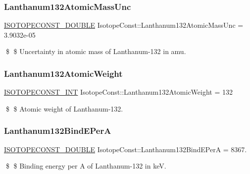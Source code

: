 \subsubsection{\texorpdfstring{Lanthanum132\+Atomic\+Mass\+Unc}{Lanthanum132AtomicMassUnc}}
{\footnotesize\ttfamily \mbox{\hyperlink{group___isotope_const-_macros_ga8f45a7272ce02c0b4c65c44636ed719a}{I\+S\+O\+T\+O\+P\+E\+C\+O\+N\+S\+T\+\_\+\+D\+O\+U\+B\+LE}} Isotope\+Const\+::\+Lanthanum132\+Atomic\+Mass\+Unc = 3.\+9032e-\/05}

\$ \$ Uncertainty in atomic mass of Lanthanum-\/132 in amu. \mbox{\label{group___isotope_const-_lanthanum-_la132_gacda93d8eca7ae011665dc08cb6784c66}} 
\subsubsection{\texorpdfstring{Lanthanum132\+Atomic\+Weight}{Lanthanum132AtomicWeight}}
{\footnotesize\ttfamily \mbox{\hyperlink{group___isotope_const-_macros_ga5f18360b3e99483a35c32d789e62621c}{I\+S\+O\+T\+O\+P\+E\+C\+O\+N\+S\+T\+\_\+\+I\+NT}} Isotope\+Const\+::\+Lanthanum132\+Atomic\+Weight = 132}

\$ \$ Atomic weight of Lanthanum-\/132. \mbox{\label{group___isotope_const-_lanthanum-_la132_ga2b69c44b3e02f89f58aaa269a42e7ec7}} 
\subsubsection{\texorpdfstring{Lanthanum132\+Bind\+E\+PerA}{Lanthanum132BindEPerA}}
{\footnotesize\ttfamily \mbox{\hyperlink{group___isotope_const-_macros_ga8f45a7272ce02c0b4c65c44636ed719a}{I\+S\+O\+T\+O\+P\+E\+C\+O\+N\+S\+T\+\_\+\+D\+O\+U\+B\+LE}} Isotope\+Const\+::\+Lanthanum132\+Bind\+E\+PerA = 8367.}

\$ \$ Binding energy per A of Lanthanum-\/132 in keV. \mbox{\label{group___isotope_const-_lanthanum-_la132_gab7ef520382ab826faf3b5ed86a4368ad}} 
